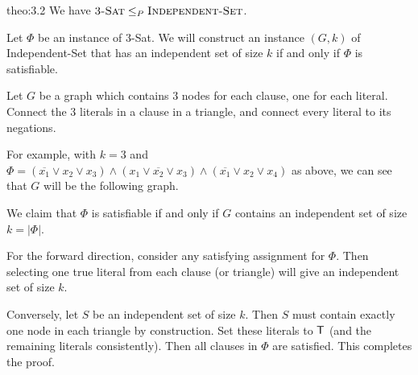 \begin{theo}{theo:3.2}
    We have $\textsc{3-Sat} \leq_P \textsc{Independent-Set}$.
\end{theo}
\begin{pf}
    Let $\Phi$ be an instance of {\sc $3$-Sat}. We will construct an instance 
    $(G, k)$ of {\sc Independent-Set} that has an independent set of size $k$ 
    if and only if $\Phi$ is satisfiable. 

    Let $G$ be a graph which contains $3$ nodes for each clause, one for 
    each literal. Connect the $3$ literals in a clause in a triangle, 
    and connect every literal to its negations. 

    For example, with $k = 3$ and $\Phi = (\overline{x_1} \vee x_2 \vee x_3) 
    \wedge (x_1 \vee \overline{x_2} \vee x_3) \wedge (\overline{x_1} \vee 
    x_2 \vee x_4)$ as above, we can see that $G$ will be the following graph. 

    \begin{center}
    \end{center}
    We claim that $\Phi$ is satisfiable if and only if $G$ contains 
    an independent set of size $k = |\Phi|$. 

    For the forward direction, consider any satisfying assignment for $\Phi$. 
    Then selecting one true literal from each clause (or triangle) will 
    give an independent set of size $k$. 

    Conversely, let $S$ be an independent set of size $k$. Then $S$ must 
    contain exactly one node in each triangle by construction. Set these 
    literals to ${\sf T}$ (and the remaining literals consistently). Then 
    all clauses in $\Phi$ are satisfied. This completes the proof. 
\end{pf}
